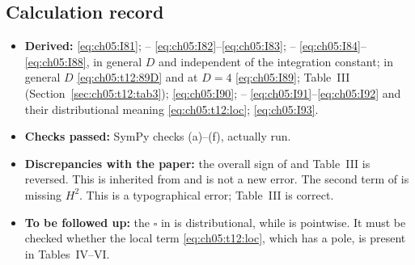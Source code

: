 \subsection{Calculation record}
\begin{itemize}[leftmargin=14pt,itemsep=1pt]
\item \textbf{Derived:}  \eqref{eq:ch05:I81}; -- \eqref{eq:ch05:I82}--\eqref{eq:ch05:I83};
-- \eqref{eq:ch05:I84}--\eqref{eq:ch05:I88}, in general $D$ and independent of the integration constant;
 in general $D$ \eqref{eq:ch05:t12:89D} and at $D=4$ \eqref{eq:ch05:I89}; Table~III (Section~\ref{sec:ch05:t12:tab3});
 \eqref{eq:ch05:I90}; -- \eqref{eq:ch05:I91}--\eqref{eq:ch05:I92} and their distributional meaning \eqref{eq:ch05:t12:loc};  \eqref{eq:ch05:I93}.
\item \textbf{Checks passed:} SymPy checks (a)--(f), actually run.
\item \textbf{Discrepancies with the paper:}
the overall sign of  and Table~III is reversed. This is inherited from  and is not a new error.
The second term of  is missing $H^2$. This is a typographical error; Table~III is correct.
\item \textbf{To be followed up:} the $\square$ in  is distributional, while  is pointwise.
It must be checked whether the local term \eqref{eq:ch05:t12:loc}, which has a pole, is present in Tables~IV--VI.
\end{itemize}

